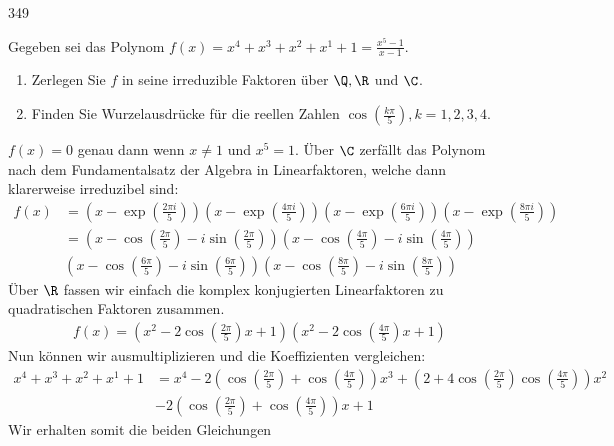 \begin{algebraUE}{349}

Gegeben sei das Polynom $f(x) = x^4 + x^3 + x^2 +x^1 + 1 = \frac{x^5 - 1}{x - 1}.$
\begin{enumerate}
  \item Zerlegen Sie $f$ in seine irreduzible Faktoren über $\Q,\R$ und $\C$.
  \item Finden Sie Wurzelausdrücke für die reellen Zahlen $\cos(\frac{k\pi}{5}), k = 1,2,3,4$.
\end{enumerate}

\end{algebraUE}

\begin{solution}
  $f(x) = 0$ genau dann wenn $x \neq 1$ und $x^5 = 1$. Über $\C$ zerfällt das
  Polynom nach dem Fundamentalsatz der Algebra in Linearfaktoren, welche dann klarerweise irreduzibel sind:
  \begin{align*}
    f(x) &= \left(x - \exp\left(\frac{2\pi i}{5}\right)\right)\left(x - \exp\left(\frac{4\pi i}{5}\right)\right)
    \left(x - \exp\left(\frac{6\pi i}{5}\right)\right)\left(x - \exp\left(\frac{8\pi i}{5}\right)\right) \\
    &= \left(x - \cos\left(\frac{2\pi}{5}\right) - i\sin\left(\frac{2\pi}{5}\right)\right)
    \left(x - \cos\left(\frac{4\pi}{5}\right) - i\sin\left(\frac{4\pi}{5}\right)\right)\\
    &\left(x - \cos\left(\frac{6\pi}{5}\right) - i\sin\left(\frac{6\pi}{5}\right)\right)
    \left(x - \cos\left(\frac{8\pi}{5}\right) - i\sin\left(\frac{8\pi}{5}\right)\right)
  \end{align*}
  Über $\R$ fassen wir einfach die komplex konjugierten Linearfaktoren zu quadratischen
  Faktoren zusammen.
  \begin{align*}
    f(x) = \left(x^2 - 2\cos\left(\frac{2\pi}{5}\right)x + 1\right)\left(x^2 - 2\cos\left(\frac{4\pi}{5}\right)x + 1\right)
  \end{align*}
  Nun können wir ausmultiplizieren und die Koeffizienten vergleichen:
  \begin{align*}
    x^4 + x^3 + x^2 +x^1 + 1 &= x^4 - 2\left(\cos\left(\frac{2\pi}{5}\right) + \cos\left(\frac{4\pi}{5}\right)\right)x^3
    + \left(2 + 4\cos\left(\frac{2\pi}{5}\right)\cos\left(\frac{4\pi}{5}\right)\right)x^2\\
    &- 2\left(\cos\left(\frac{2\pi}{5}\right) + \cos\left(\frac{4\pi}{5}\right)\right)x
    + 1
  \end{align*}
  Wir erhalten somit die beiden Gleichungen

\end{solution}
